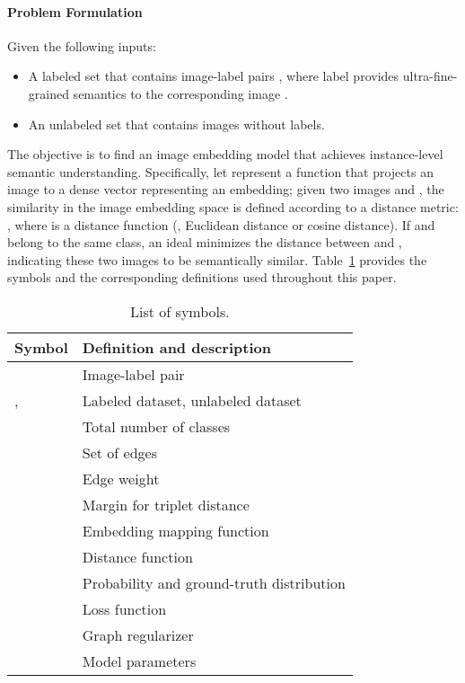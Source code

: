 \documentclass[sigconf]{acmart}
\begin{document}
\paragraph{Problem Formulation}
Given the following inputs: 
\begin{itemize}
    \item A labeled set  that contains image-label pairs , where label  provides ultra-fine-grained semantics to the corresponding image .
    \item An unlabeled set  that contains images without labels.
\end{itemize}
The objective is to find an image embedding model that achieves instance-level semantic understanding. Specifically, let  represent a function that projects an image to a dense vector representing an embedding; given two images  and , the similarity in the image embedding space is defined according to a distance metric: , where  is a distance function (\eg, Euclidean distance or cosine distance). If  and  belong to the same class, an ideal  minimizes the distance between  and , indicating these two images to be semantically similar. Table~\ref{tbl:symbol_table} provides the symbols and the corresponding definitions used throughout this paper.

\begin{table}[tbp]
\small
\caption{List of symbols.}
\label{tbl:symbol_table}
\begin{tabular}{ll}
\toprule
Symbol & Definition and description\\
	\hline
		 & Image-label pair \\ 
	, 	 & Labeled dataset, unlabeled dataset \\
	 & Total number of classes  \\ 
     & Set of edges \\ 
     & Edge weight \\ 
     & Margin for triplet distance \\
     & Embedding mapping function  \\ 
     & Distance function  \\ 
     & Probability and ground-truth distribution \\  
     & Loss function \\ 
     & Graph regularizer \\     
     & Model parameters \\ 
\bottomrule    
\end{tabular}
\end{table}
\end{document}
